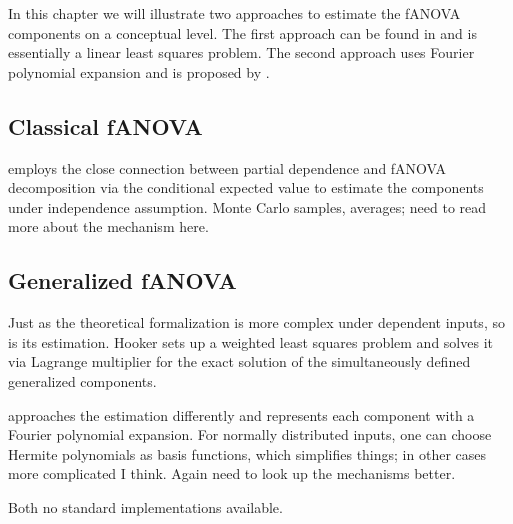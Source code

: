 In this chapter we will illustrate two approaches to estimate the fANOVA components on a conceptual level. The first approach can be found in \cite{hooker2007} and is essentially a linear least squares problem. The second approach uses Fourier polynomial expansion and is proposed by \cite{rahman2014}.

\subsection*{Classical fANOVA}
\cite{hooker2004} employs the close connection between partial dependence and fANOVA decomposition via the conditional expected value to estimate the components under independence assumption.
Monte Carlo samples, averages; need to read more about the mechanism here.

\subsection*{Generalized fANOVA}
Just as the theoretical formalization is more complex under dependent inputs, so is its estimation.
Hooker sets up a weighted least squares problem and solves it via Lagrange multiplier for the exact solution of the simultaneously defined generalized components. 

\cite{rahman2014} approaches the estimation differently and represents each component with a Fourier polynomial expansion. For normally distributed inputs, one can choose Hermite polynomials as basis functions, which simplifies things; in other cases more complicated I think.
Again need to look up the mechanisms better.

Both no standard implementations available. 
